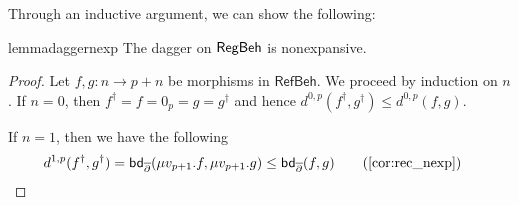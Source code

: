 Through an inductive argument, we can show the following:
\begin{restatable}{lemma}{daggernexp}\label{lem:dagger_nonexpansive}
	The dagger on $\mathsf{RegBeh}$ is nonexpansive.
\end{restatable}
\begin{proof}
	Let $f,g \colon n \to p + n$ be morphisms in $\mathsf{RefBeh}$. We proceed by induction on $n$. If $n = 0$, then $f^\dagger = f = 0_p = g = g^\dagger$ and hence $d^{0, p}(f^\dagger, g^\dagger) \leq d^{0, p}(f, g)$.
	
	If $n = 1$, then we have the following
	\begin{align*}
		d^{1,p}(f^\dagger, g^\dagger) &= \mathsf{bd}_{\overline\partial} (\mu v_{p+1}.f, \mu v_{p+1}. g)\leq \mathsf{bd}_{\overline\partial} (f, g) \tag{\Cref{cor:rec_nexp}} 
	\end{align*}
	

\end{proof}
